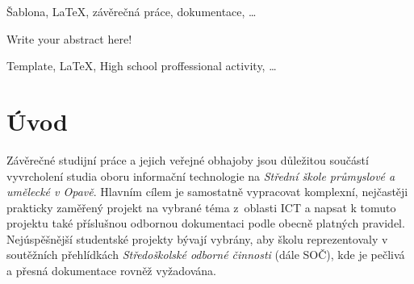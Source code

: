 \documentclass[12pt, a4paper,
twoside,        %
openright
]{report}
\begin{document}
	\vspace{18pt}
	
	
	\noindent Šablona, \LaTeX, závěrečná práce, dokumentace, \dots 
	
	\vspace{18pt}

	
	\noindent Write your abstract here! \lipsum[1] %
	
	\vspace{18pt}
	
	
	\noindent Template, \LaTeX, High school proffessional activity, \dots 
	
	\clearpage %

	
	\tableofcontents %

	\setcounter{page}{1} %

	\chapter*{Úvod}
Závěrečné studijní práce a jejich veřejné obhajoby jsou důležitou součástí vyvrcholení studia oboru informační technologie na \textit{Střední škole průmyslové a umělecké v Opavě}. Hlavním cílem je samostatně vypracovat komplexní, nejčastěji prakticky zaměřený projekt na vybrané téma z~oblasti ICT a napsat k tomuto projektu také příslušnou odbornou dokumentaci podle obecně platných pravidel. Nejúspěšnější studentské projekty bývají vybrány, aby školu reprezentovaly v soutěžních přehlídkách \emph{Středoškolské odborné činnosti} (dále SOČ), kde je pečlivá a přesná dokumentace rovněž vyžadována.
\end{document}
